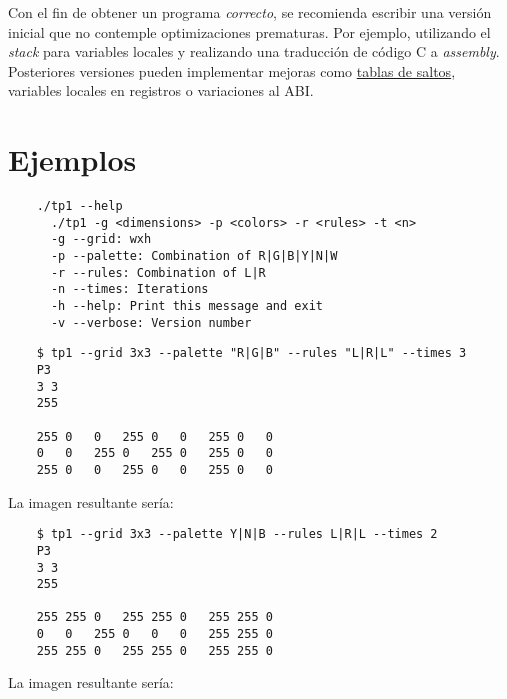 \documentclass{article}
\begin{document}
Con el fin de obtener un programa \textit{correcto}, se recomienda escribir una versión inicial que no contemple
optimizaciones prematuras. Por ejemplo, utilizando el \textit{stack} para variables locales y realizando una traducción
de código C a \textit{assembly}. Posteriores versiones pueden implementar mejoras como \underline{tablas de saltos},
variables locales en registros o variaciones al ABI.

\pagebreak
\section{Ejemplos}

    \begin{verbatim}
    ./tp1 --help
      ./tp1 -g <dimensions> -p <colors> -r <rules> -t <n>
      -g --grid: wxh
      -p --palette: Combination of R|G|B|Y|N|W
      -r --rules: Combination of L|R
      -n --times: Iterations
      -h --help: Print this message and exit
      -v --verbose: Version number
    \end{verbatim}

    \begin{verbatim}
    $ tp1 --grid 3x3 --palette "R|G|B" --rules "L|R|L" --times 3
    P3
    3 3
    255

    255 0   0   255 0   0   255 0   0
    0   0   255 0   255 0   255 0   0 
    255 0   0   255 0   0   255 0   0
    \end{verbatim}
La imagen resultante sería:
\begin{center}
\end{center}

    \begin{verbatim}
    $ tp1 --grid 3x3 --palette Y|N|B --rules L|R|L --times 2
    P3
    3 3
    255

    255 255 0   255 255 0   255 255 0
    0   0   255 0   0   0   255 255 0
    255 255 0   255 255 0   255 255 0
    \end{verbatim}
La imagen resultante sería:
\begin{center}
\end{center}
\end{document}
